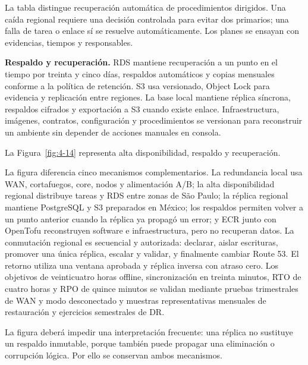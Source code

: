 La tabla distingue recuperación automática de procedimientos dirigidos. Una caída regional requiere una decisión controlada para evitar dos primarios; una falla de tarea o enlace sí se resuelve automáticamente. Los planes se ensayan con evidencias, tiempos y responsables.

\textbf{Respaldo y recuperación.} RDS mantiene recuperación a un punto en el tiempo por treinta y cinco días, respaldos automáticos y copias mensuales conforme a la política de retención. S3 usa versionado, Object Lock para evidencia y replicación entre regiones. La base local mantiene réplica síncrona, respaldos cifrados y exportación a S3 cuando existe enlace. Infraestructura, imágenes, contratos, configuración y procedimientos se versionan para reconstruir un ambiente sin depender de acciones manuales en consola.

La Figura~\ref{fig:4-14} representa alta disponibilidad, respaldo y recuperación.



La figura diferencia cinco mecanismos complementarios. La redundancia local usa WAN, cortafuegos, core, nodos y alimentación A/B; la alta disponibilidad regional distribuye tareas y RDS entre zonas de São Paulo; la réplica regional mantiene PostgreSQL y S3 preparados en México; los respaldos permiten volver a un punto anterior cuando la réplica ya propagó un error; y ECR junto con OpenTofu reconstruyen software e infraestructura, pero no recuperan datos. La conmutación regional es secuencial y autorizada: declarar, aislar escrituras, promover una única réplica, escalar y validar, y finalmente cambiar Route 53. El retorno utiliza una ventana aprobada y réplica inversa con atraso cero. Los objetivos de veinticuatro horas offline, sincronización en treinta minutos, RTO de cuatro horas y RPO de quince minutos se validan mediante pruebas trimestrales de WAN y modo desconectado y muestras representativas mensuales de restauración y ejercicios semestrales de DR.

La figura deberá impedir una interpretación frecuente: una réplica no sustituye un respaldo inmutable, porque también puede propagar una eliminación o corrupción lógica. Por ello se conservan ambos mecanismos.

